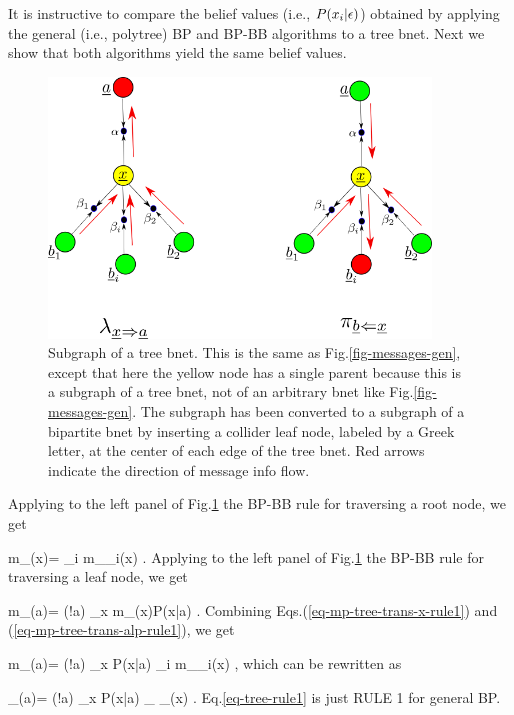 It is instructive to 
compare the belief values (i.e., $P(x_i|\epsilon)$)
obtained by
 applying the 
general (i.e., polytree)  BP  
and  BP-BB algorithms  to a tree bnet.
Next we show that both algorithms 
yield the same belief values.

\begin{figure}[h!]
\centering
\includegraphics[width=4in]
{mpass/mpass-messages-bip-tree.png}
\caption{Subgraph of a tree bnet. 
This 
is the same as 
Fig.\ref{fig-messages-gen},
except that here the yellow
node has a single
parent because 
this is a subgraph of a tree
bnet, not
of an arbitrary
bnet like Fig.\ref{fig-messages-gen}.
The subgraph has been
converted to a subgraph
of a bipartite bnet
by inserting a collider leaf node, labeled
by a Greek letter, 
at the center
of each edge of the tree bnet.
Red arrows indicate
the direction
of message info flow.}
\label{fig-messages-bip-tree}
\end{figure}

Applying to the left panel of
Fig.\ref{fig-messages-bip-tree}
 the BP-BB rule
for traversing a root node, we get

\beq
m_{\alp\ldart \rvx}(x)=
\prod_{i}
m_{\beta_i\rdart \rvx}(x)
\;.
\label{eq-mp-tree-trans-x-rule1}
\eeq
Applying to the left panel of
Fig.\ref{fig-messages-bip-tree}
 the BP-BB rule
for traversing a leaf node, we get

\beq
m_{\alp\rdart\rva}(a)=
\caln(!a)
\sum_x
m_{\alp\ldart \rvx}(x)P(x|a)
\;.
\label{eq-mp-tree-trans-alp-rule1}
\eeq
Combining Eqs.(\ref{eq-mp-tree-trans-x-rule1})
and (\ref{eq-mp-tree-trans-alp-rule1}), we get

\beq
m_{\alp\rdart\rva}(a)=
\caln(!a)
\sum_x P(x|a)
\prod_{i}
m_{\beta_i\rdart \rvx}(x)
\;,
\eeq
which can be
rewritten as 

\beq
\lam_{\rvx\rdart\rva}(a)=
\caln(!a)
\sum_x P(x|a)
_
{\lam_\rvx(x)}
\;.
\label{eq-tree-rule1}
\eeq
Eq.\ref{eq-tree-rule1} is just RULE 1
for general BP.

